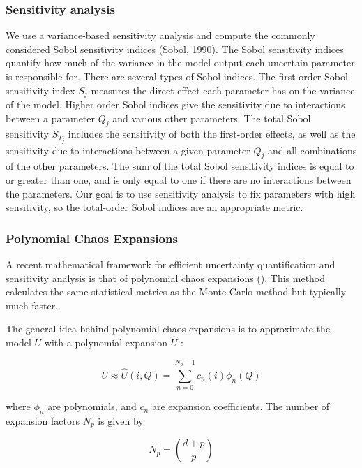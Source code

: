 \documentclass[utf8]{frontiersSCNS}
\begin{document}
\subsubsection{Sensitivity analysis}

We use a variance-based sensitivity analysis and compute the commonly considered Sobol sensitivity indices
(Sobol, 1990). The Sobol sensitivity indices quantify how much of the variance in the model output each
uncertain parameter is responsible for. There are several types of Sobol indices. The first order Sobol
sensitivity index $S_j$ measures the direct effect each parameter has on the variance of the model. Higher order
Sobol indices give the sensitivity due to interactions between a parameter $Q_j$ and various other parameters.
The total Sobol sensitivity $S_{T_{j}}$ includes the sensitivity of both the first-order effects, as well as the
sensitivity due to interactions between a given parameter $Q_j$ and all combinations of the other
parameters. The sum of the total Sobol sensitivity indices is equal to or greater than one, and is only equal to
one if there are no interactions between the parameters. Our goal is to use sensitivity analysis to fix
parameters with high sensitivity, so the total-order Sobol indices are an appropriate metric.

\subsubsection{Polynomial Chaos Expansions}

A recent mathematical framework for efficient uncertainty quantification and sensitivity analysis is that of
polynomial chaos expansions (\cite{Xiu_2005}). This method calculates the same statistical metrics as the Monte
Carlo method but typically much faster.

The general idea behind polynomial chaos expansions is to approximate the model $U$ with a polynomial expansion
$\hat{U}$ : 

\begin{equation} U \approx \hat{U}(i, Q) = \sum_{n=0}^{N_p-1} c_n(i) \phi_n(Q) \end{equation}

where $\phi_n$ are polynomials, and $c_n$ are expansion coefficients. The number of expansion factors $N_p$ is
given by

\begin{equation}
  N_p = \binom{d+p}{p}
\end{equation}
\end{document}
